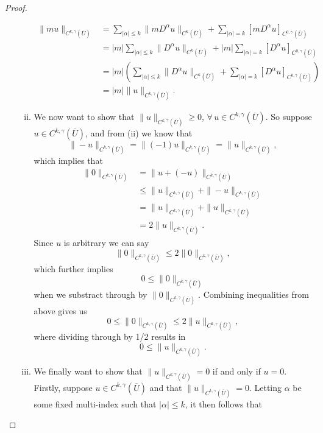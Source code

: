 \documentclass[11pt]{article}
\begin{document}
\begin{proof}
\begin{enumerate}[1.]
\begin{enumerate}[(i)]
\begin{align*}
						\|mu\|_{C^{k,\gamma}(\overline{U})} &= \sum_{|\alpha| \leq k}\|mD^{\alpha}u\|_{C^k(\overline{U})}
						                                      +\sum_{|\alpha| = k}[mD^{\alpha}u]_{C^{0,\gamma}(\overline{U})} \\
										    &= |m|\sum_{|\alpha| \leq k}\|D^{\alpha}u\|_{C^k(\overline{U})}
						                                      +|m|\sum_{|\alpha| = k}[D^{\alpha}u]_{C^{0,\gamma}(\overline{U})} \\
										    &= |m|(\sum_{|\alpha| \leq k}\|D^{\alpha}u\|_{C^k(\overline{U})}
										      +\sum_{|\alpha| = k}[D^{\alpha}u]_{C^{0,\gamma}(\overline{U})}) \\
										    &= |m|\|u\|_{C^{k,\gamma}(\overline{U})}.
					\end{align*}
				\item We now want to show that $\|u\|_{C^{k,\gamma}(\overline{U})} \geq 0$, $\forall \, u \in C^{k,\gamma}(\overline{U})$.
					So suppose $u \in C^{k,\gamma}(\overline{U})$, and from (ii) we know that
					\[\|-u\|_{C^{k,\gamma}(\overline{U})} = \|(-1)u\|_{C^{k,\gamma}(\overline{U})} = \|u\|_{C^{k,\gamma}(\overline{U})},\]
					which implies that
					\begin{align*}
						\|0\|_{C^{k,\gamma}(\overline{U})} &= \|u + (-u)\|_{C^{k,\gamma}(\overline{U})} \\
										   &\leq \|u\|_{C^{k,\gamma}(\overline{U})} + \|-u\|_{C^{k,\gamma}(\overline{U})} \\
										   &= \|u\|_{C^{k,\gamma}(\overline{U})} + \|u\|_{C^{k,\gamma}(\overline{U})}\\
										   &= 2\|u\|_{C^{k,\gamma}(\overline{U})}.
					\end{align*}
					Since $u$ is arbitrary we can say
					\[\|0\|_{C^{k,\gamma}(\overline{U})} \leq 2\|0\|_{C^{k,\gamma}(\overline{U})},\]
					which further implies
					\[0 \leq \|0\|_{C^{k,\gamma}(\overline{U})}\]
					when we substract through by $\|0\|_{C^{k,\gamma}(\overline{U})}$. Combining inequalities from above gives us
					\[0 \leq \|0\|_{C^{k,\gamma}(\overline{U})} \leq 2\|u\|_{C^{k,\gamma}(\overline{U})},\]
					where dividing through by 1/2 results in
					\[0 \leq \|u\|_{C^{k,\gamma}(\overline{U})}.\]
				\item We finally want to show that $\|u\|_{C^{k,\gamma}(\overline{U})} = 0$ if and only if $u = 0$.
					Firstly, suppose $u \in C^{k,\gamma}(\overline{U})$ and that $\|u\|_{C^{k,\gamma}(\overline{U})} = 0$.
					Letting $\alpha$ be some fixed multi-index such that $|\alpha| \leq k$, it then follows that

\end{enumerate}
\end{enumerate}
\end{proof}
\end{document}
